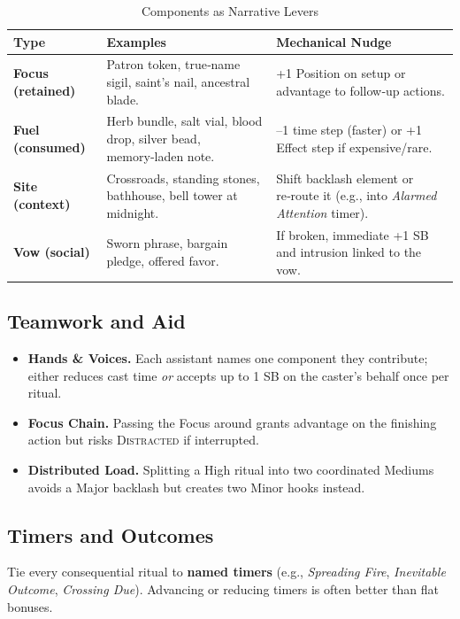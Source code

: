 \begin{longtable}{>{\bfseries}l X X}
\caption{Components as Narrative Levers}\label{tab:ritual_components}\\
\toprule
\textbf{Type} & \textbf{Examples} & \textbf{Mechanical Nudge} \\
\midrule
Focus (retained) & Patron token, true‑name sigil, saint's nail, ancestral blade. & +1 Position on setup or advantage to follow‑up actions. \\
Fuel (consumed) & Herb bundle, salt vial, blood drop, silver bead, memory‑laden note. & --1 time step (faster) or +1 Effect step if expensive/rare. \\
Site (context) & Crossroads, standing stones, bathhouse, bell tower at midnight. & Shift backlash element or re‑route it (e.g., into \emph{Alarmed Attention} timer). \\
Vow (social) & Sworn phrase, bargain pledge, offered favor. & If broken, immediate +1 SB and intrusion linked to the vow. \\
\bottomrule
\end{longtable}

\subsection{Teamwork and Aid}\label{subsec:ritual_teamwork}
\begin{itemize}
    \item \textbf{Hands \& Voices.} Each assistant names one component they contribute; either reduces cast time \emph{or} accepts up to 1 SB on the caster's behalf once per ritual.
    \item \textbf{Focus Chain.} Passing the Focus around grants advantage on the finishing action but risks \textsc{Distracted} if interrupted.
    \item \textbf{Distributed Load.} Splitting a High ritual into two coordinated Mediums avoids a Major backlash but creates two Minor hooks instead.
\end{itemize}

\subsection{Timers and Outcomes}\label{subsec:ritual_timers}
Tie every consequential ritual to \textbf{named timers} (e.g., \emph{Spreading Fire}, \emph{Inevitable Outcome}, \emph{Crossing Due}). Advancing or reducing timers is often better than flat bonuses.

